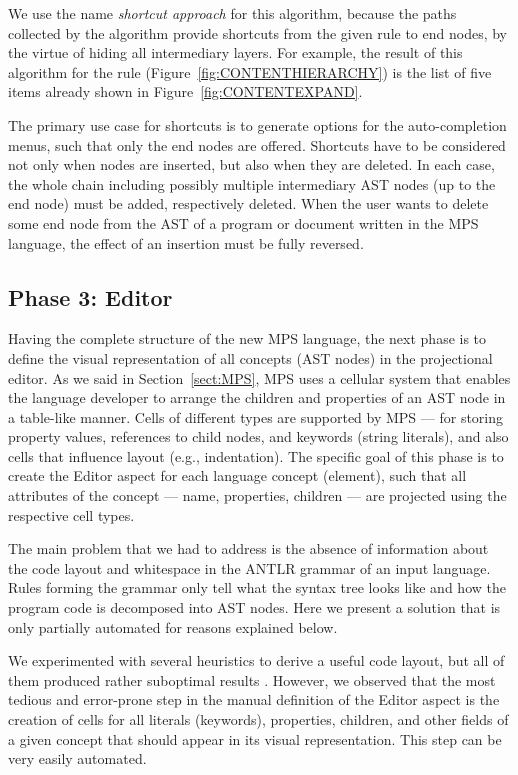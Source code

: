 We use the name \emph{shortcut approach} for this algorithm, because the paths collected by the algorithm provide shortcuts from the given rule to end nodes, by the virtue of hiding all intermediary layers.
For example, the result of this algorithm for the  rule (Figure~\ref{fig:CONTENTHIERARCHY}) is the list of five items already shown in Figure~\ref{fig:CONTENTEXPAND}.

The primary use case for shortcuts is to generate options for the auto-completion menus, such that only the end nodes are offered.
Shortcuts have to be considered not only when nodes are inserted, but also when they are deleted.
In each case, the whole chain including possibly multiple intermediary AST nodes (up to the end node) must be added, respectively deleted.
When the user wants to delete some end node from the AST of a program or document written in the MPS language, the effect of an insertion must be fully reversed.

\subsection{Phase 3: Editor}
\label{sect:EDITORDEF}

Having the complete structure of the new MPS language, the next phase is to define the visual representation of all concepts (AST nodes) in the projectional editor.
As we said in Section~\ref{sect:MPS}, MPS uses a cellular system that enables the language developer to arrange the children and properties of an AST node in a table-like manner.
Cells of different types are supported by MPS --- for storing property values, references to child nodes, and keywords (string literals), and also cells that influence layout (e.g., indentation).
The specific goal of this phase is to create the Editor aspect for each language concept (element), such that all attributes of the concept --- name, properties, children --- are projected using the respective cell types.

The main problem that we had to address is the absence of information about the code layout and whitespace in the ANTLR grammar of an input language.
Rules forming the grammar only tell what the syntax tree looks like and how the program code is decomposed into AST nodes.
Here we present a solution that is only partially automated for reasons explained below.

We experimented with several heuristics to derive a useful code layout, but all of them produced rather suboptimal results .
However, we observed that the most tedious and error-prone step in the manual definition of the Editor aspect is the creation of cells for all literals (keywords), properties, children, and other fields of a given concept that should appear in its visual representation.
This step can be very easily automated.

